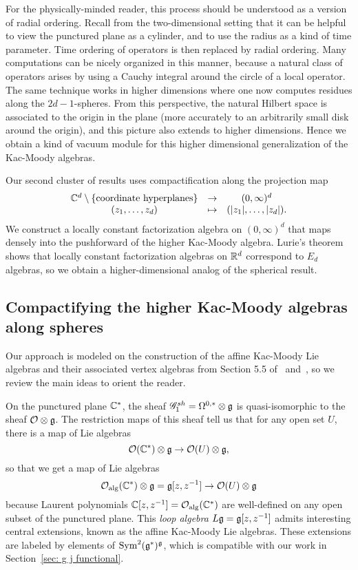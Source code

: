 For the physically-minded reader, 
this process should be understood as a version of radial ordering.
Recall from the two-dimensional setting that it can be helpful to view the punctured plane as a cylinder,
and to use the radius as a kind of time parameter.
Time ordering of operators is then replaced by radial ordering.
Many computations can be nicely organized in this manner,
because a natural class of operators arises by using a Cauchy integral around the circle of a local operator.
The same technique works in higher dimensions where one now computes residues along the $2d-1$-spheres.
From this perspective, the natural Hilbert space is associated to the origin in the plane
(more accurately to an arbitrarily small disk around the origin),
and this picture also extends to higher dimensions.
Hence we obtain a kind of vacuum module for this higher dimensional generalization of the Kac-Moody algebras.

Our second cluster of results uses compactification along the projection map
\[
\begin{array}{ccc}
\mathbb C^d \setminus \{\text{coordinate hyperplanes}\} & \to & (0,\infty)^d \\
(z_1,\ldots,z_d) & \mapsto & (|z_1|,\ldots,|z_d|).
\end{array}
\]
We construct a locally constant factorization algebra on $(0,\infty)^d$ that maps densely into the pushforward of the higher Kac-Moody algebra. 
Lurie's theorem shows that locally constant factorization algebras on $\mathbb R^d$ correspond to $E_d$ algebras,
so we obtain a higher-dimensional analog of the spherical result.

\subsection{Compactifying the higher Kac-Moody algebras along spheres}
\label{sec: spheres}

Our approach is modeled on the construction of the affine Kac-Moody Lie algebras and their associated vertex algebras from Section 5.5 of~\cite{CG1} and~\cite{GwThesis},
so we review the main ideas to orient the reader.

On the punctured plane $\mathbb C^*$, the sheaf $
\mathscr G_1^{sh} = \Omega^{0,*} \otimes \mathfrak g$ is quasi-isomorphic to the sheaf $\mathcal O \otimes \mathfrak g$.
The restriction maps of this sheaf tell us that for any open set $U$, there is a map of Lie algebras
\[
\mathcal O(\mathbb C^*) \otimes \mathfrak g \to \mathcal O(U) \otimes \mathfrak g,
\]
so that we get a map of Lie algebras
\[
\mathcal O_{\rm alg}(\mathbb C^*) \otimes \mathfrak g = \mathfrak g[z,z^{-1}] \to  \mathcal O(U) \otimes \mathfrak g
\]
because Laurent polynomials $\mathbb C[z,z^{-1}] = \mathcal O_{\rm alg}(\mathbb C^*)$ are well-defined on any open subset of the punctured plane.
This {\em loop algebra} $L\mathfrak g = \mathfrak g[z,z^{-1}]$ admits interesting central extensions,
known as the affine Kac-Moody Lie algebras.
These extensions are labeled by elements of ${\rm Sym}^2(\mathfrak g^*)^\mathfrak g$, 
which is compatible with our work in Section~\ref{sec: g j functional}.

